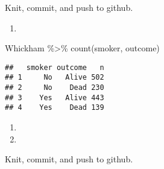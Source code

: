 \documentclass[
]{article}
\newenvironment{Shaded}{\begin{snugshade}}{\end{snugshade}}
\newcommand{\FunctionTok}[1]{\textcolor[rgb]{0.00,0.00,0.00}{#1}}
\newcommand{\NormalTok}[1]{#1}
\newcommand{\SpecialCharTok}[1]{\textcolor[rgb]{0.00,0.00,0.00}{#1}}
\providecommand{\tightlist}{%
  \setlength{\itemsep}{0pt}\setlength{\parskip}{0pt}}
\begin{document}
Knit, commit, and push to github.

\begin{enumerate}
\def\labelenumi{\arabic{enumi}.}
\setcounter{enumi}{4}
\tightlist
\item
\end{enumerate}

\begin{Shaded}
\begin{Highlighting}[]
\NormalTok{Whickham }\SpecialCharTok{\%\textgreater{}\%}
  \FunctionTok{count}\NormalTok{(smoker, outcome)}
\end{Highlighting}
\end{Shaded}

\begin{verbatim}
##   smoker outcome   n
## 1     No   Alive 502
## 2     No    Dead 230
## 3    Yes   Alive 443
## 4    Yes    Dead 139
\end{verbatim}

\begin{enumerate}
\def\labelenumi{\arabic{enumi}.}
\setcounter{enumi}{5}
\tightlist
\item
\item
\end{enumerate}

Knit, commit, and push to github.
\end{document}
